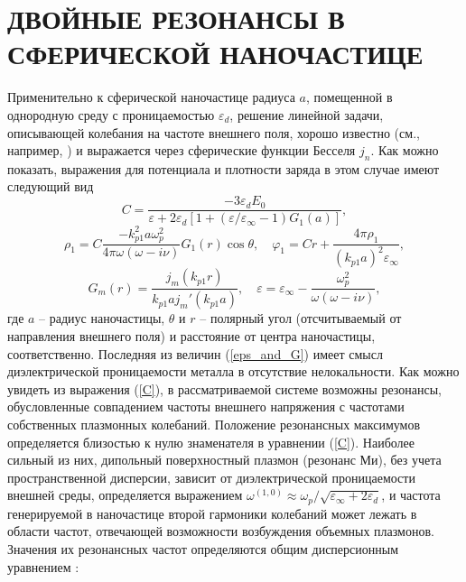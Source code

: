 \documentclass[12pt, a4paper]{article}
\def \eps {\varepsilon}
\def \w {\omega}
\def \ph {\varphi}
\begin{document}
\section{ДВОЙНЫЕ РЕЗОНАНСЫ В СФЕРИЧЕСКОЙ НАНОЧАСТИЦЕ}
Применительно к сферической наночастице радиуса $a$, помещенной в однородную среду с проницаемостью $\eps_d$, решение линейной задачи, описывающей колебания на частоте внешнего поля, хорошо известно (см., например, \cite{Gildenburg1965,Ruppin1975,HuaGersten1986}) и выражается через сферические функции Бесселя $j_n$. Как можно показать, выражения для потенциала и плотности заряда в этом случае имеют следующий вид
\begin{equation} 
	\label{C}
	C= \frac{-3\eps_d E_0}{\eps + 2\eps_d [1 + (\eps/\eps_\infty - 1) G_1(a) ]},  
\end{equation}
\begin{equation} 
	\label{rho_and_phi}
	\rho_1 = C \frac{-k_{p1}^2a\w_p^2}{4\pi\w(\w - i \nu) } G_1(r)\cos\theta, \quad \ph_1 = C r + \frac{4\pi \rho_1 }{(k_{p1}a)^2 \eps_\infty},
\end{equation}
\begin{equation}
	\label{eps_and_G}
		 G_m(r) =\frac{j_m(k_{p1}r)}{k_{p1}a j_m'(k_{p1}a)},\quad
	\eps = \eps_\infty - \frac{\w_p^2}{\w(\w - i\nu)},
\end{equation}
где $a$ -- радиус наночастицы, $\theta$ и $r$  -- полярный угол (отсчитываемый от направления внешнего поля) и расстояние от центра наночастицы, соответственно. Последняя из величин (\ref{eps_and_G}) имеет смысл диэлектрической проницаемости металла в отсутствие нелокальности. Как можно увидеть из выражения (\ref{C}),  в рассматриваемой
системе возможны резонансы, обусловленные совпадением частоты
внешнего напряжения с частотами собственных плазмонных колебаний.
Положение резонансных максимумов определяется близостью к нулю знаменателя в уравнении (\ref{C}). 
Наиболее сильный из них, дипольный поверхностный плазмон (резонанс Ми), без учета пространственной дисперсии, зависит от диэлектрической проницаемости внешней среды, определяется выражением $\w^{(1,0)} \approx \w_p / \sqrt{\eps_\infty + 2\eps_d}  $, и частота генерируемой в наночастице второй гармоники колебаний может лежать в области частот, отвечающей возможности возбуждения объемных плазмонов. Значения их резонансных частот определяются общим дисперсионным уравнением \cite{Gildenburg2016}:
\end{document}
